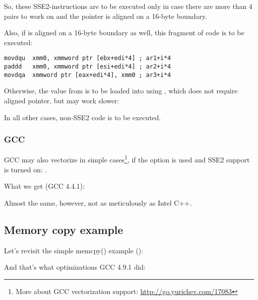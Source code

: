 So, these SSE2-instructions are to be executed only in case there are more than 4 pairs to work on
and the pointer  is aligned on a 16-byte boundary.

Also, if  is aligned on a 16-byte boundary as well, 
this fragment of code is to be executed:

\begin{lstlisting}
movdqu  xmm0, xmmword ptr [ebx+edi*4] ; ar1+i*4
paddd   xmm0, xmmword ptr [esi+edi*4] ; ar2+i*4
movdqa  xmmword ptr [eax+edi*4], xmm0 ; ar3+i*4
\end{lstlisting}

Otherwise, the value from  is to be loaded into  using \MOVDQU,
which does not require aligned pointer, but may work slower:



In all other cases, non-SSE2 code is to be executed.

\subsubsection{GCC}

\newcommand{\URLGCCVEC}{\url{http://go.yurichev.com/17083}}

GCC may also vectorize in simple cases\footnote{More about GCC vectorization support: \URLGCCVEC},
if the \Othree option is used and SSE2 support is turned on: .

What we get (GCC 4.4.1):



Almost the same, however, not as meticulously as Intel C++.

\subsection{Memory copy example}
\label{vec_memcpy}

Let's revisit the simple memcpy() example
():



And that's what optimizations GCC 4.9.1 did:


